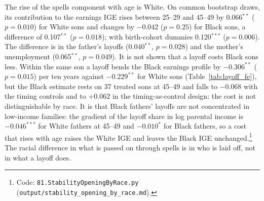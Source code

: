 The rise of the spells component with age is White. On common bootstrap draws, its contribution to the earnings IGE
rises between 25--29 and 45--49 by 0.066$^{**}$ ($p = 0.010$) for White sons and changes by $-0.042$ ($p = 0.25$) for
Black sons, a difference of 0.107$^{**}$ ($p = 0.018$); with birth-cohort dummies 0.120$^{***}$ ($p = 0.006$). The
difference is in the father's layoffs (0.040$^{**}$, $p = 0.028$) and the mother's unemployment (0.065$^{**}$,
$p = 0.049$). It is not shown that a layoff costs Black sons less. Within the same son a layoff bends the Black
earnings profile by $-0.306^{**}$ ($p = 0.015$) per ten years against $-0.229^{**}$ for White sons
(Table~\ref{tab:layoff_fe}), but the Black estimate rests on 37 treated sons at 45--49 and falls to $-0.068$ with the
timing controls and to $+0.062$ in the timing-as-control design: the cost is not distinguishable by race.
It is that Black fathers' layoffs are not concentrated in low-income families: the gradient of the layoff share in log
parental income is $-0.046^{***}$ for White fathers at 45--49 and $-0.010^{*}$ for Black fathers, so a cost that rises
with age raises the White IGE and leaves the Black IGE unchanged.\footnote{Code: \texttt{81.StabilityOpeningByRace.py}
(\texttt{output/stability\_opening\_by\_race.md}).} The racial difference in what is passed on through spells is in who
is laid off, not in what a layoff does.

